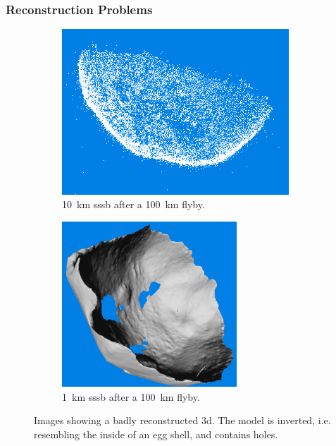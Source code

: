 \subsubsection{Reconstruction Problems} \label{sec:recon_problems}
\begin{figure}[htb]
    \centering
        \begin{subfigure}[b]{0.42\textwidth}
            \centering
            \includegraphics[width=\textwidth,height=6.2cm]{doc/thesis/0_figures/models_quality/broken/broken_points1.png}
            \caption{\SI{10}{\kilo\meter} \gls{sssb} after a \SI{100}{\kilo\meter} flyby.} %
            \label{fig:models_broken_points}
        \end{subfigure}
        \begin{subfigure}[b]{0.42\textwidth}
            \centering
            \includegraphics[width=\textwidth,height=6.2cm]{doc/thesis/0_figures/models_quality/broken/broken_refine2.png}
            \caption{\SI{1}{\kilo\meter} \gls{sssb} after a \SI{100}{\kilo\meter} flyby.}
            \label{fig:models_broken_mesh}
        \end{subfigure}
    \caption{Images showing a badly reconstructed \gls{3d}. The model is inverted, i.e. resembling the inside of an egg shell, and contains holes.}
    \label{fig:models_broken}
\end{figure}

